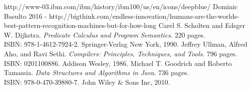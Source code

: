 \documentclass{article}
\begin{document}
\begin{thebibliography}{99}

 http://www-03.ibm.com/ibm/history/ibm100/us/en/icons/deepblue/
Dominic Basulto 2016 - http://bigthink.com/endless-innovation/humans-are-the-worlds-best-pattern-recognition-machines-but-for-how-long
 Carel S. Scholten and Edsger W. Dijkstra. \emph{Predicate Calculus and Program Semantics}. 220 pages. \\ISBN: 978-1-4612-7924-2. Springer-Verlag New York, 1990.
 Jeffrey Ullman, Alfred Aho, and Ravi Sethi. \emph{Compilers: Principles, Techniques, and Tools}. 796 pages. \\ISBN: 0201100886. Addison Wesley, 1986.
 Michael T. Goodrich and Roberto Tamassia. \emph{Data Structures and Algorithms in Java}. 736 pages. \\ISBN: 978-0-470-39880-7. John Wiley \& Sons Inc, 2010.
\end{thebibliography}
\end{document}
